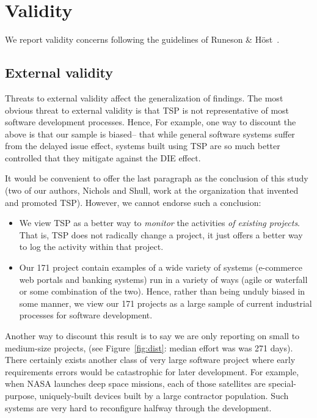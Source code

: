 \documentclass{sig-alternate}
\newcommand{\bi}{\begin{itemize}}%
\newcommand{\ei}{\end{itemize}}
\newcommand{\fig}[1]{Figure~\ref{fig:#1}}
\def\baselinestretch{1}
\begin{document}
%


 


 
 

\section{Validity}
We report validity concerns following the guidelines of Runeson \& H\"{o}st~\cite{runeson09}.

\subsection{External validity}
Threats to external validity affect the generalization of findings. The most obvious threat to external validity is that TSP is not representative of most software development processes. Hence,
For example, 
one way to discount the above is that our sample is biased-- that while general software
systems suffer from the delayed issue effect, systems built using TSP are so much better controlled
that they  mitigate against the DIE effect.

It would be convenient to offer the last paragraph as the conclusion of this study
(two of our authors, Nichols and Shull,  work at the organization that invented and promoted TSP).
 However, we cannot endorse such a conclusion:
 \bi
 \item
We view TSP as a better way to
 {\em monitor} the activities {\em of  existing projects}. That is, TSP
 does not radically change a project, it just offers a better way to log the activity within
 that project. 
 \item
 Our 171 project contain examples of a wide variety
 of systems (e-commerce web portals and  banking systems) run in a variety of
 ways (agile or  waterfall or some combination of the two). Hence, rather
 than being unduly  biased in some manner,
 we view our 171 projects as a large sample of current industrial processes for software
 development.
 \ei
Another way to discount this result is to say we are only reporting on small to medium-size
projects,
(see
\fig{dist}:  median
effort was was  
271 days). 
There certainly exists another class of very large software project where early requirements
errors would be catastrophic for later development. For example, when NASA launches deep space missions,
each of those satellites are special-purpose, uniquely-built devices built by a large contractor
population. Such systems are very hard to reconfigure halfway through the development.  
\end{document}
